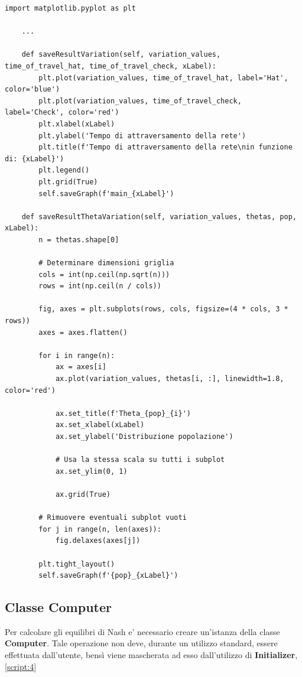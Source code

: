 \begin{lstlisting}[style=myStile, caption={Initializer::showResultPlot}, label={script:7}]
    import matplotlib.pyplot as plt

    ...

    def saveResultVariation(self, variation_values, time_of_travel_hat, time_of_travel_check, xLabel):
        plt.plot(variation_values, time_of_travel_hat, label='Hat', color='blue')
        plt.plot(variation_values, time_of_travel_check, label='Check', color='red')
        plt.xlabel(xLabel)
        plt.ylabel('Tempo di attraversamento della rete')
        plt.title(f'Tempo di attraversamento della rete\nin funzione di: {xLabel}')
        plt.legend()
        plt.grid(True)
        self.saveGraph(f'main_{xLabel}')
        
    def saveResultThetaVariation(self, variation_values, thetas, pop, xLabel):
        n = thetas.shape[0]
        
        # Determinare dimensioni griglia
        cols = int(np.ceil(np.sqrt(n)))
        rows = int(np.ceil(n / cols))

        fig, axes = plt.subplots(rows, cols, figsize=(4 * cols, 3 * rows))
        axes = axes.flatten()

        for i in range(n):
            ax = axes[i]
            ax.plot(variation_values, thetas[i, :], linewidth=1.8, color='red')

            ax.set_title(f'Theta_{pop}_{i}')
            ax.set_xlabel(xLabel)
            ax.set_ylabel('Distribuzione popolazione')

            # Usa la stessa scala su tutti i subplot
            ax.set_ylim(0, 1)

            ax.grid(True)

        # Rimuovere eventuali subplot vuoti
        for j in range(n, len(axes)):
            fig.delaxes(axes[j])

        plt.tight_layout()
        self.saveGraph(f'{pop}_{xLabel}')
\end{lstlisting}

\subsection{Classe Computer}
\label{subsec:Computer}

Per calcolare gli equilibri di Nash e' necessario creare un'istanza della classe \textbf{Computer}. Tale operazione non deve, durante un utilizzo standard, essere effettuata dall'utente,
bensì viene mascherata ad esso dall'utilizzo di \textbf{Initializer}, \autoref{script:4}


